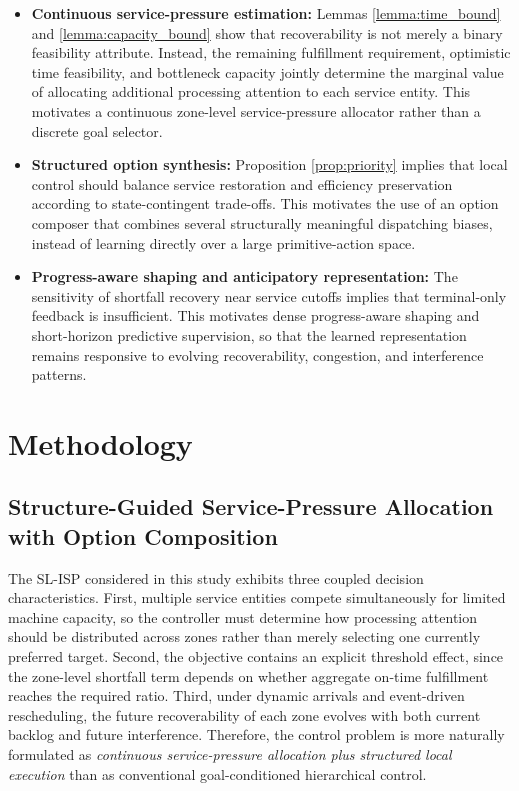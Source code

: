 \documentclass[a4paper,fleqn]{cas-sc}
\begin{document}
\begin{itemize}
    \item \textbf{Continuous service-pressure estimation:} Lemmas \ref{lemma:time_bound} and \ref{lemma:capacity_bound} show that recoverability is not merely a binary feasibility attribute. Instead, the remaining fulfillment requirement, optimistic time feasibility, and bottleneck capacity jointly determine the marginal value of allocating additional processing attention to each service entity. This motivates a continuous zone-level service-pressure allocator rather than a discrete goal selector.
    \item \textbf{Structured option synthesis:} Proposition \ref{prop:priority} implies that local control should balance service restoration and efficiency preservation according to state-contingent trade-offs. This motivates the use of an option composer that combines several structurally meaningful dispatching biases, instead of learning directly over a large primitive-action space.
    \item \textbf{Progress-aware shaping and anticipatory representation:} The sensitivity of shortfall recovery near service cutoffs implies that terminal-only feedback is insufficient. This motivates dense progress-aware shaping and short-horizon predictive supervision, so that the learned representation remains responsive to evolving recoverability, congestion, and interference patterns.
\end{itemize}

\section{Methodology}
\label{sec:methodology}

\subsection{Structure-Guided Service-Pressure Allocation with Option Composition}
\label{subsec:spa_oc}

The SL-ISP considered in this study exhibits three coupled decision characteristics. First, multiple service entities compete simultaneously for limited machine capacity, so the controller must determine how processing attention should be distributed across zones rather than merely selecting one currently preferred target. Second, the objective contains an explicit threshold effect, since the zone-level shortfall term depends on whether aggregate on-time fulfillment reaches the required ratio. Third, under dynamic arrivals and event-driven rescheduling, the future recoverability of each zone evolves with both current backlog and future interference. Therefore, the control problem is more naturally formulated as \emph{continuous service-pressure allocation plus structured local execution} than as conventional goal-conditioned hierarchical control.
\end{document}

